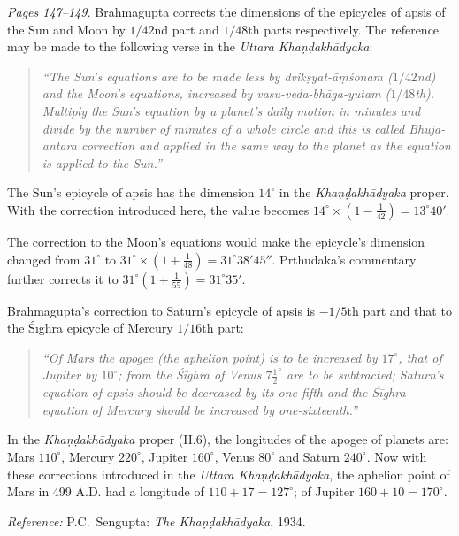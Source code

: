 \documentclass[11pt,a4paper]{article}
\newcommand{\cnote}[1]{\textcolor{notecolor}{\textit{#1}}}
\begin{document}
\cnote{Pages 147--149.} Brahmagupta corrects the dimensions of the epicycles of apsis of the Sun and Moon by $1/42$nd part and $1/48$th parts respectively. The reference may be made to the following verse in the \textit{Uttara Khaṇḍakhādyaka}:

\begin{quote}
\textit{``The Sun's equations are to be made less by dvikṣyat-āṃśonam ($1/42$nd) and the Moon's equations, increased by vasu-veda-bhāga-yutam ($1/48$th). Multiply the Sun's equation by a planet's daily motion in minutes and divide by the number of minutes of a whole circle and this is called Bhuja-antara correction and applied in the same way to the planet as the equation is applied to the Sun.''}
\end{quote}

The Sun's epicycle of apsis has the dimension $14^\circ$ in the \textit{Khaṇḍakhādyaka} proper. With the correction introduced here, the value becomes $14^\circ \times (1 - \frac{1}{42}) = 13^\circ 40'$.

The correction to the Moon's equations would make the epicycle's dimension changed from $31^\circ$ to $31^\circ \times (1 + \frac{1}{48}) = 31^\circ 38' 45''$. Prthūdaka's commentary further corrects it to $31^\circ(1 + \frac{1}{55}) = 31^\circ 35'$.

Brahmagupta's correction to Saturn's epicycle of apsis is $-1/5$th part and that to the Śīghra epicycle of Mercury $1/16$th part:

\begin{quote}
\textit{``Of Mars the apogee (the aphelion point) is to be increased by $17^\circ$, that of Jupiter by $10^\circ$; from the Śīghra of Venus $7\frac{1}{2}^\circ$ are to be subtracted; Saturn's equation of apsis should be decreased by its one-fifth and the Śīghra equation of Mercury should be increased by one-sixteenth.''}
\end{quote}

In the \textit{Khaṇḍakhādyaka} proper (II.6), the longitudes of the apogee of planets are: Mars $110^\circ$, Mercury $220^\circ$, Jupiter $160^\circ$, Venus $80^\circ$ and Saturn $240^\circ$. Now with these corrections introduced in the \textit{Uttara Khaṇḍakhādyaka}, the aphelion point of Mars in 499 A.D. had a longitude of $110 + 17 = 127^\circ$; of Jupiter $160 + 10 = 170^\circ$.

\cnote{Reference:} P.C.\ Sengupta: \textit{The Khaṇḍakhādyaka}, 1934.



\end{document}
